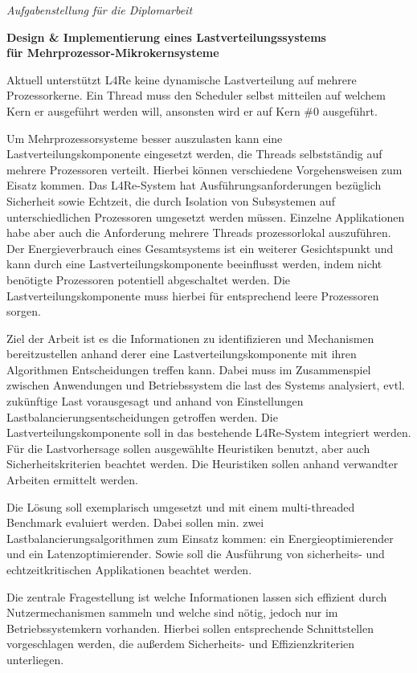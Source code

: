 \begin{centering}
\large
\textit{Aufgabenstellung für die Diplomarbeit}
\\
\end{centering}

\vspace{1cm}

\begin{flushright}
\normalsize\noindent
\textbf{Design \& Implementierung eines Lastverteilungssystems\\ für
Mehrprozessor-Mikrokernsysteme}\\
\end{flushright}
\vspace{3mm}

Aktuell unterstützt L4Re keine dynamische Lastverteilung auf mehrere
Prozessorkerne. Ein Thread muss den Scheduler selbst mitteilen auf welchem Kern
er ausgeführt werden will, ansonsten wird er auf Kern \#0 ausgeführt.

Um Mehrprozessorsysteme besser auszulasten kann eine Lastverteilungskomponente
eingesetzt werden, die Threads selbstständig auf mehrere Prozessoren verteilt.
Hierbei können verschiedene Vorgehensweisen zum Eisatz kommen.
Das L4Re-System hat Ausführungsanforderungen bezüglich Sicherheit sowie
Echtzeit, die durch Isolation von Subsystemen auf unterschiedlichen Prozessoren
umgesetzt werden müssen. Einzelne Applikationen habe aber auch die Anforderung
mehrere Threads prozessorlokal auszuführen.
Der Energieverbrauch eines Gesamtsystems ist ein weiterer Gesichtspunkt und
kann durch eine Lastverteilungskomponente beeinflusst werden, indem nicht
benötigte Prozessoren potentiell abgeschaltet werden. Die
Lastverteilungskomponente muss hierbei für entsprechend leere Prozessoren
sorgen.

Ziel der Arbeit ist es die Informationen zu identifizieren und Mechanismen
bereitzustellen anhand derer eine Lastverteilungskomponente mit  ihren
Algorithmen Entscheidungen treffen kann. Dabei muss im Zusammenspiel zwischen
Anwendungen und Betriebssystem die last des Systems analysiert, evtl.
zukünftige Last vorausgesagt und anhand von Einstellungen
Lastbalancierungsentscheidungen getroffen werden.
Die Lastverteilungskomponente soll in das bestehende L4Re-System integriert
werden.
Für die Lastvorhersage sollen ausgewählte Heuristiken benutzt, aber auch
Sicherheitskriterien beachtet werden.
Die Heuristiken sollen anhand verwandter Arbeiten ermittelt werden.

Die Lösung soll exemplarisch umgesetzt und mit einem multi-threaded Benchmark
evaluiert werden.
Dabei sollen min. zwei Lastbalancierungsalgorithmen zum Einsatz kommen: ein
Energieoptimierender und ein Latenzoptimierender. Sowie soll die Ausführung von
sicherheits- und echtzeitkritischen Applikationen beachtet werden.

Die zentrale Fragestellung ist welche Informationen lassen sich effizient durch
Nutzermechanismen sammeln und welche sind nötig, jedoch nur im
Betriebssystemkern vorhanden. Hierbei sollen entsprechende Schnittstellen
vorgeschlagen werden, die außerdem Sicherheits- und Effizienzkriterien
unterliegen.

